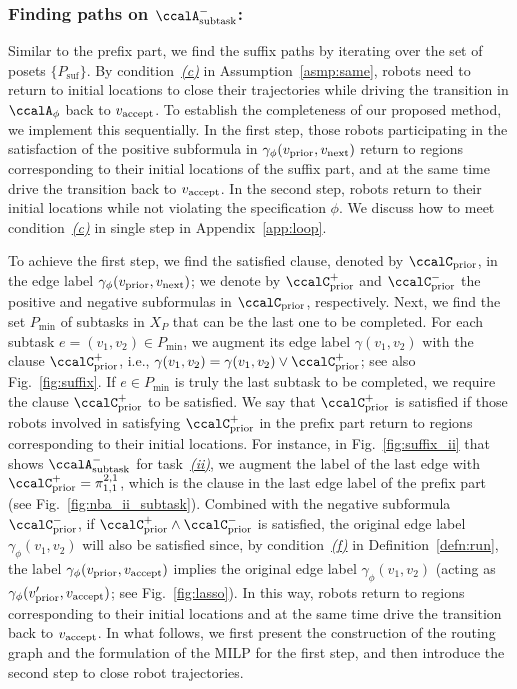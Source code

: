 \documentclass[Afour,sageh,times]{sagej}
\newcommand{\auto}[1]{\ccalA_{\textup{#1}}}
\newcommand{\autop}{\ccalA_{\phi}}
\newcommand{\vertex}[1]{v_{\textup{#1}}}
\renewcommand{\ap}[3]{\mathcal{\pi}_{{#1},{#2}}^{#3}}
\begin{document}
{{\subsubsection{Finding paths  on $\auto{subtask}^-$:}\label{sec:suf_milp} Similar to the prefix part, we find the suffix paths by iterating over the set of posets $\{P_\text{suf}\}$. By condition~\hyperref[asmp:c]{\it (c)} in Assumption~\ref{asmp:same}, robots need to return to initial locations to close their trajectories while driving the transition in $\autop$ back to $\vertex{accept}$. To establish the completeness of our proposed method, we implement this sequentially. In the first step, those robots participating in the satisfaction of the positive subformula in $\gamma_\phi(\vertex{prior}, \vertex{next})$ return to  regions corresponding to their initial locations of the suffix part, and at the same time drive the transition back to $\vertex{accept}$. In the second step, robots return to their initial locations while not violating the specification $\phi$. We  discuss how to  meet condition~\hyperref[asmp:c]{\it (c)} in single step in Appendix~\ref{app:loop}.



 To achieve the first step, we  find the satisfied clause, denoted by $\ccalC_{\text{prior}}$, in the edge label $\gamma_\phi(\vertex{prior}, \vertex{next})$; we denote by  $\ccalC_{\text{prior}}^+$ and $\ccalC_{\text{prior}}^-$ the positive and negative subformulas in $\ccalC_{\text{prior}}$, respectively.  Next, we find the set $P_{\text{min}}$ of subtasks in $X_P$ that can be the last one to be completed. For each subtask $e = (v_1, v_2) \in P_{\text{min}}$, we augment its edge label $\gamma(v_1, v_2)$ with the clause $\ccalC_{\text{prior}}^+$, i.e., $\gamma(v_1, v_2) = \gamma(v_1, v_2) \vee \ccalC_{\text{prior}}^+$; see also Fig.~\ref{fig:suffix}.  If $e \in P_{\text{min}}$ is truly the last subtask to be completed, we require the clause $\ccalC_{\text{prior}}^+$ to be satisfied. We say that $\ccalC_{\text{prior}}^+$ is satisfied if those robots involved in satisfying $\ccalC_{\text{prior}}^+$ in the prefix part return to  regions corresponding to their initial locations. For instance, in Fig.~\ref{fig:suffix_ii} that shows $\auto{subtask}^-$ for task~\hyperref[task:ii]{\it (ii)}, we augment the label of the last edge with $\ccalC_{\text{prior}}^+ = \ap{1}{1}{2,1}$, which is the clause in the last edge label of the prefix part (see Fig.~\ref{fig:nba_ii_subtask}). Combined with the negative subformula $\ccalC_{\text{prior}}^-$, if $\ccalC_{\text{prior}}^+ \wedge \ccalC_{\text{prior}}^-$ is satisfied, the original edge label $\gamma_\phi(v_1, v_2)$  will also be satisfied since, by condition~\hyperref[cond:f]{\it (f)} in Definition~\ref{defn:run}, the label $\gamma_\phi(\vertex{prior}, \vertex{accept})$ implies the original edge label $\gamma_\phi(v_1, v_2)$ (acting as $\gamma_\phi(\vertex{prior}', \vertex{accept})$; see Fig.~\ref{fig:lasso}). In this way, robots return to regions corresponding to their initial locations and at the same time drive the transition back to $\vertex{accept}$. In what follows, we first  present the construction of the routing graph and the formulation of the MILP for the first step, and then introduce the second step to close robot trajectories.
}}
\end{document}
